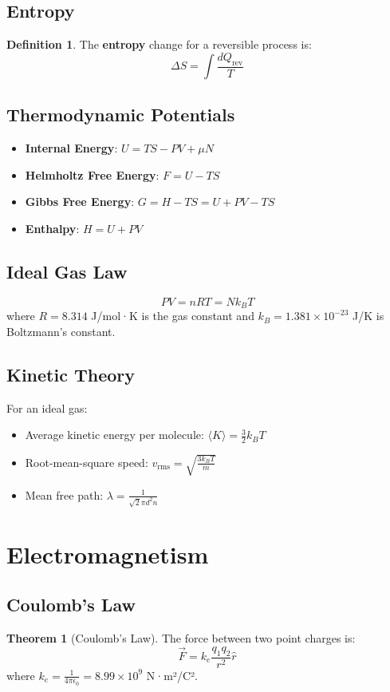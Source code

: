 \documentclass[11pt]{article}
\theoremstyle{definition}
\newtheorem{definition}{Definition}[section]
\newtheorem{theorem}{Theorem}[section]
\begin{document}
\subsection{Entropy}
\begin{definition}
The \textbf{entropy} change for a reversible process is:
$$\Delta S = \int \frac{dQ_{\text{rev}}}{T}$$
\end{definition}

\subsection{Thermodynamic Potentials}
\begin{itemize}
    \item \textbf{Internal Energy}: $U = TS - PV + \mu N$
    \item \textbf{Helmholtz Free Energy}: $F = U - TS$
    \item \textbf{Gibbs Free Energy}: $G = H - TS = U + PV - TS$
    \item \textbf{Enthalpy}: $H = U + PV$
\end{itemize}

\subsection{Ideal Gas Law}
$$PV = nRT = Nk_B T$$
where $R = 8.314$ J/mol·K is the gas constant and $k_B = 1.381 \times 10^{-23}$ J/K is Boltzmann's constant.

\subsection{Kinetic Theory}
For an ideal gas:
\begin{itemize}
    \item Average kinetic energy per molecule: $\langle K \rangle = \frac{3}{2}k_B T$
    \item Root-mean-square speed: $v_{\text{rms}} = \sqrt{\frac{3k_B T}{m}}$
    \item Mean free path: $\lambda = \frac{1}{\sqrt{2}\pi d^2 n}$
\end{itemize}

\section{Electromagnetism}

\subsection{Coulomb's Law}
\begin{theorem}[Coulomb's Law]
The force between two point charges is:
$$\vec{F} = k_e \frac{q_1 q_2}{r^2} \hat{r}$$
where $k_e = \frac{1}{4\pi\epsilon_0} = 8.99 \times 10^9$ N·m²/C².
\end{theorem}
\end{document}
